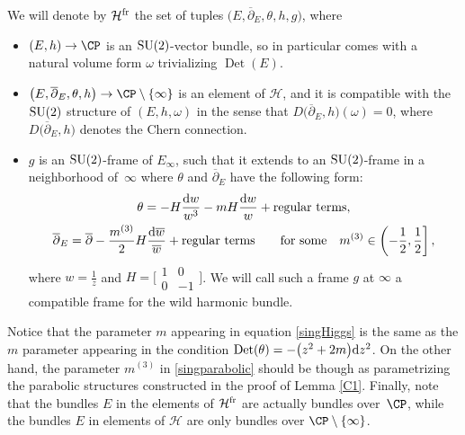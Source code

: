 \begin{Definition}\label{maindef}
We will denote by $\mathcal{H}^{{\rm fr}}$ the set of tuples $\bigl(E,\overline{\partial}_E,\theta,h,g\bigr)$, where
\begin{itemize}\itemsep=0pt
 \item $(E,h)\to \CP$ is an ${\rm SU}(2)$-vector bundle, so in particular comes with a natural volume form $\omega$ trivializing $\operatorname{Det}(E)$.
 \item $\bigl(E,\overline{\partial}_E,\theta,h\bigr)\to \CP \setminus \{\infty\}$ is an element of $\mathcal{H}$, and it is compatible with the ${\rm SU}(2)$ structure of $(E,h,\omega)$ in the sense that $D\bigl(\overline{\partial}_E,h\bigr)(\omega)=0$, where $D\bigl(\overline{\partial}_E,h\bigr)$ denotes the Chern connection.
 \item $g$ is an ${\rm SU}(2)$-frame of $E_\infty$, such that it extends to an ${\rm SU}(2)$-frame in a neighborhood of~$\infty$ where $\theta$ and $\overline{\partial}_E$ have the following form:
\begin{gather}
 \theta= -H\frac{{\rm d}w}{w^3}-mH\frac{{\rm d}w}{w}+\text{regular terms},\label{singHiggs}
\\
 \overline{\partial}_E=\overline{\partial}-\frac{m^{(3)}}{2}H\frac{{\rm d}\overline{w}}{\overline{w}}+\text{regular terms} \qquad \text{for some}\quad m^{(3)}\in \left(-\frac{1}{2},\frac{1}{2}\right],\label{singparabolic}
 \end{gather}
 where $w=\frac{1}{z}$ and $H=\bigl[\begin{smallmatrix}
 1&0\\
 0&-1\end{smallmatrix}\bigr]$.
 We will call such a frame $g$ at $\infty$ a compatible frame for the wild harmonic bundle.
\end{itemize}
\end{Definition}

Notice that the parameter $m$ appearing in equation \eqref{singHiggs} is the same as the $m$ parameter appearing in the condition $\textnormal{Det}(\theta)=-\bigl(z^2+2m\bigr){\rm d}z^2$. On the other hand, the parameter $m^{(3)}$ in \eqref{singparabolic} should be though as parametrizing the parabolic structures constructed in the proof of Lemma \ref{C1}. Finally, note that the bundles $E$ in the elements of $\mathcal{H}^{{\rm fr}}$ are actually bundles over~$\CP$, while the bundles $E$ in elements of $\mathcal{H}$ are only bundles over $\CP \setminus \{\infty\}$.

